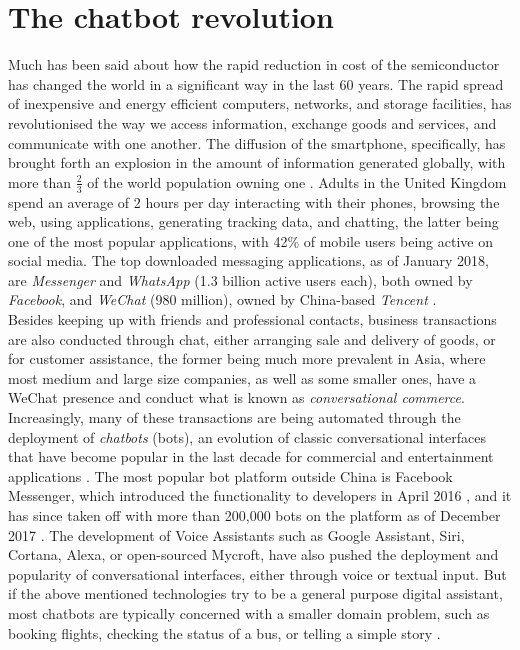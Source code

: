 \section{The chatbot revolution}
Much has been said about how the rapid reduction in cost of the semiconductor has changed the world in a significant way in the last 60 years. The rapid spread of inexpensive and energy efficient computers, networks, and storage facilities, has revolutionised the way we access information, exchange goods and services, and communicate with one another. The diffusion of the smartphone, specifically, has brought forth an explosion in the amount of information generated globally, with more than $\frac{2}{3}$ of the world population owning one \cite{wearesocial}. Adults in the United Kingdom spend an average of 2 hours per day interacting with their phones, browsing the web, using applications, generating tracking data, and chatting, the latter being one of the most popular applications, with 42\% of mobile users \cite{mobilesocial} being active on social media. The top downloaded messaging applications, as of January 2018, are \textit{Messenger} and \textit{WhatsApp} (1.3 billion active users each), both owned by \textit{Facebook}, and \textit{WeChat} (980 million), owned by China-based \textit{Tencent} \cite{mobilestatista}. \\
Besides keeping up with friends and professional contacts, business transactions are also conducted through chat, either arranging sale and delivery of goods, or for customer assistance, the former being much more prevalent in Asia, where most medium and large size companies, as well as some smaller ones, have a WeChat presence and conduct what is known as \textit{conversational commerce}. Increasingly, many of these transactions are being automated through the deployment of \textit{chatbots} (bots), an evolution of classic conversational interfaces that have become popular in the last decade for commercial and entertainment applications \cite{Dale2016}. The most popular bot platform outside China is Facebook Messenger, which introduced the functionality to developers in April 2016 \cite{Messenger2016}, and it has since taken off with more than 200,000 bots on the platform as of December 2017 \cite{Messenger2017}. The development of Voice Assistants such as Google Assistant, Siri, Cortana, Alexa, or open-sourced Mycroft, have also pushed the deployment and popularity of conversational interfaces, either through voice or textual input. But if the above mentioned technologies try to be a general purpose digital assistant, most chatbots are typically concerned with a smaller domain problem, such as booking flights, checking the status of a bus, or telling a simple story \cite{meisel}. \\
